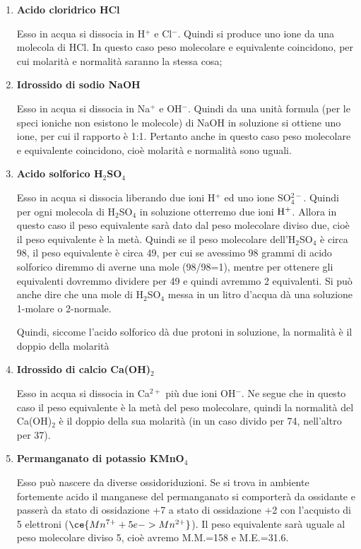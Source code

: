\begin{enumerate}
    \item \textbf{Acido cloridrico HCl}
    
    Esso in acqua si dissocia in H$^+$ e Cl$^-$. Quindi si produce uno ione da una molecola di HCl. In questo caso peso molecolare e equivalente coincidono, per cui molarità e normalità saranno la stessa cosa;
    \item \textbf{Idrossido di sodio NaOH}
    
    Esso in acqua si dissocia in Na$^+$ e OH$^-$. Quindi da una unità formula (per le speci ioniche non esistono le molecole) di NaOH in soluzione si ottiene uno ione, per cui il rapporto è 1:1. Pertanto anche in questo caso peso molecolare e equivalente coincidono, cioè molarità e normalità sono uguali.
    \item \textbf{Acido solforico H$_2$SO$_4$}
    
    Esso in acqua si dissocia liberando due ioni H$^+$ ed uno ione SO$_4^{2-}$. Quindi per ogni molecola di H$_2$SO$_4$ in soluzione otterremo due ioni $\rm H^+$. Allora in questo caso il peso equivalente sarà dato dal peso molecolare diviso due, cioè il peso equivalente è la metà. Quindi se il peso molecolare dell'H$_2$SO$_4$ è circa 98, il peso equivalente è circa 49, per cui se avessimo 98 grammi di acido solforico diremmo di averne una mole (98/98=1), mentre per ottenere gli equivalenti dovremmo dividere per 49 e quindi avremmo 2 equivalenti. Si può anche dire che una mole di H$_2$SO$_4$ messa in un litro d'acqua dà una soluzione 1-molare o 2-normale.

    Quindi, siccome l'acido solforico dà due protoni in soluzione, la normalità è il doppio della molarità
    \item \textbf{Idrossido di calcio Ca(OH)$_2$}
    
    Esso in acqua si dissocia in Ca$^{2+}$ più due ioni OH$^-$. Ne segue che in questo caso il peso equivalente è la metà del peso molecolare, quindi la normalità del Ca(OH)$_2$ è il doppio della sua molarità (in un caso divido per 74, nell'altro per 37).
    \item \textbf{Permanganato di potassio KMnO$_4$}
    
    Esso può nascere da diverse ossidoriduzioni. Se si trova in ambiente fortemente acido il manganese del permanganato si comporterà da ossidante e passerà da stato di ossidazione +7 a stato di ossidazione +2 con l'acquisto di 5 elettroni ($\ce{Mn^{7+} + 5e -> Mn^{2+}}$). Il peso equivalente sarà uguale al peso molecolare diviso 5, cioè avremo M.M.=158 e M.E.=31.6.


\end{enumerate}
